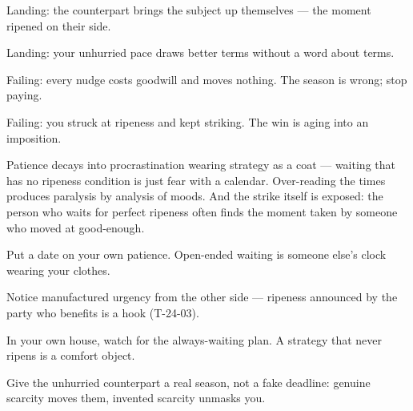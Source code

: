 \begin{feedback}
  \item Landing: the counterpart brings the subject up themselves --- the moment ripened on their side.
  \item Landing: your unhurried pace draws better terms without a word about terms.
  \item Failing: every nudge costs goodwill and moves nothing. The season is wrong; stop paying.
  \item Failing: you struck at ripeness and kept striking. The win is aging into an imposition.
\end{feedback}
\begin{failure}
Patience decays into procrastination wearing strategy as a coat --- waiting that has no ripeness condition is just fear with a calendar. Over-reading the times produces paralysis by analysis of moods. And the strike itself is exposed: the person who waits for perfect ripeness often finds the moment taken by someone who moved at good-enough.
\end{failure}
\begin{countermeasures}
  \item Put a date on your own patience. Open-ended waiting is someone else's clock wearing your clothes.
  \item Notice manufactured urgency from the other side --- ripeness announced by the party who benefits is a hook (T-24-03).
  \item In your own house, watch for the always-waiting plan. A strategy that never ripens is a comfort object.
  \item Give the unhurried counterpart a real season, not a fake deadline: genuine scarcity moves them, invented scarcity unmasks you.
\end{countermeasures}

\seesources
{}
